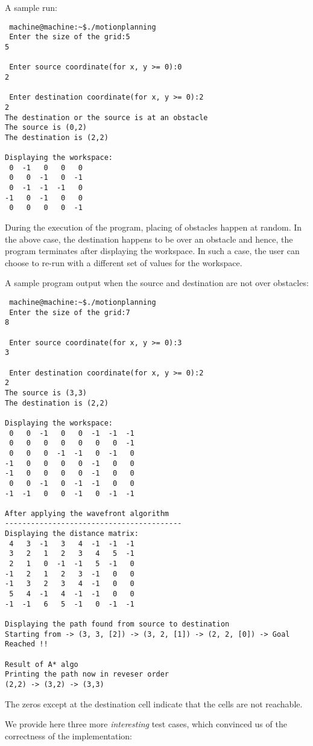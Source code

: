 \documentclass[12pt]{article}
\begin{document}
A sample run:
	\begin{verbatim}
 machine@machine:~$./motionplanning
 Enter the size of the grid:5
5

 Enter source coordinate(for x, y >= 0):0
2

 Enter destination coordinate(for x, y >= 0):2
2
The destination or the source is at an obstacle
The source is (0,2) 
The destination is (2,2) 

Displaying the workspace:
 0	-1	 0	 0	 0	
 0	 0	-1	 0	-1	
 0	-1	-1	-1	 0	
-1	 0	-1	 0	 0	
 0	 0	 0	 0	-1	
	\end{verbatim}
	During the execution of the program, placing of obstacles happen
  at random. In the above case, the destination happens to be over an
  obstacle and hence, the program terminates after displaying the
  workspace. In such a case, the user can choose to re-run with a
  different set of values for the \textsf{workspace}.

A sample program output when the source and destination are not over obstacles:
	
	\begin{verbatim}
 machine@machine:~$./motionplanning
 Enter the size of the grid:7
8

 Enter source coordinate(for x, y >= 0):3
3

 Enter destination coordinate(for x, y >= 0):2
2
The source is (3,3) 
The destination is (2,2) 

Displaying the workspace:
 0	 0	-1	 0	 0	-1	-1	-1	
 0	 0	 0	 0	 0	 0	 0	-1	
 0	 0	 0	-1	-1	 0	-1	 0	
-1	 0	 0	 0	 0	-1	 0	 0	
-1	 0	 0	 0	 0	-1	 0	 0	
 0	 0	-1	 0	-1	-1	 0	 0	
-1	-1	 0	 0	-1	 0	-1	-1	

After applying the wavefront algorithm
-----------------------------------------
Displaying the distance matrix:
 4	 3	-1	 3	 4	-1	-1	-1	
 3	 2	 1	 2	 3	 4	 5	-1	
 2	 1	 0	-1	-1	 5	-1	 0	
-1	 2	 1	 2	 3	-1	 0	 0	
-1	 3	 2	 3	 4	-1	 0	 0	
 5	 4	-1	 4	-1	-1	 0	 0	
-1	-1	 6	 5	-1	 0	-1	-1	

Displaying the path found from source to destination 
Starting from -> (3, 3, [2]) -> (3, 2, [1]) -> (2, 2, [0]) -> Goal Reached !!

Result of A* algo
Printing the path now in reveser order
(2,2) -> (3,2) -> (3,3)
	\end{verbatim}
  The zeros except at the destination cell indicate that the cells are
not reachable.

	We provide here three more \textit{interesting} test cases, which
  convinced us of the correctness of the implementation:
	
\end{document}
